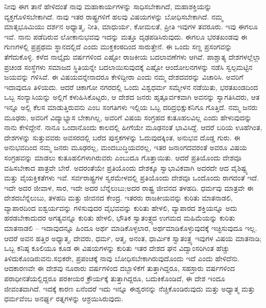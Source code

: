 ನೀವು ಈಗ ತಾನೆ ಹೇಳಿದಂತೆ ನಾವು ಮಹಾಕಾರ್ಯಗಳನ್ನು ಸಾಧಿಸಬೇಕಾಗಿದೆ, ಮಹಾಶಕ್ತಿಯನ್ನು ವ್ಯಕ್ತಗೊಳಿಸಬೇಕಾಗಿದೆ. ನಾವು ಇತರ ರಾಷ್ಟ್ರಗಳಿಗೆ ಹಲವು ವಿಷಯಗಳನ್ನು ಬೋಧಿಸಬೇಕಾಗಿದೆ. ನಮ್ಮ ಮಾತೃಭೂಮಿಯು ದರ್ಶನ ಅಧ್ಯಾತ್ಮ, ನೀತಿ, ಮಾಧುರ್ಯ, ಕೋಮಲತೆ, ಪ್ರೀತಿ ಇವುಗಳ ತವರೂರು. ಇವು ಈಗಲೂ ಇವೆ. ನಾನು ಪಡೆದಿರುವ ಲೋಕಾನುಭವವು ಇದನ್ನು ಮತ್ತೂ ದೃಢಪಡಿಸಿರುವುದು. ಈಗಲೂ ಭರತಖಂಡವು ಈ ಗುಣಗಳಲ್ಲಿ ಪ್ರಪ್ರಥಮ ಸ್ಥಾನದಲ್ಲಿದೆ ಎಂದು ಮುಕ್ತಕಂಠದಿಂದ ಸಾರುತ್ತೇನೆ. ಈ ಒಂದು ಸಣ್ಣ ಪ್ರಸಂಗವನ್ನು ತೆಗೆದುಕೊಳ್ಳಿ. ಕಳೆದ ನಾಲ್ಕೈದು ವರ್ಷಗಳಿಂದ ಎಷ್ಟೋ ರಾಜಕೀಯ ಬದಲಾವಣೆಗಳು ಆಗಿವೆ. ಪಾಶ್ಚಾತ್ಯ ದೇಶಗಳಲ್ಲೆಲ್ಲಾ ಪ್ರಚಂಡ ಸಂಸ್ಥೆಗಳು ಸಮಾಜದ ಸ್ಥಿತಿಯನ್ನೇ ಬದಲಾಯಿಸುವುದಕ್ಕೆ ಎಷ್ಟೋ ಆಂದೋಲನಗಳನ್ನು ನಡೆಸಿ ಸ್ವಲ್ಪಮಟ್ಟಿನ ಜಯವನ್ನು ಗಳಿಸಿವೆ. ಈ ವಿಷಯವನ್ನೇನಾದರೂ ಕೇಳಿದ್ದೀರಾ ಎಂದು ನಮ್ಮ ದೇಶದವರನ್ನು ವಿಚಾರಿಸಿ. ಅವರಿಗೆ ಇದಾವುದೂ ತಿಳಿಯದು. ಆದರೆ ಚಿಕಾಗೋ ನಗರದಲ್ಲಿ ಒಂದು ವಿಶ್ವಧರ್ಮ ಸಮ್ಮೇಳನ ನಡೆಯಿತು, ಭರತಖಂಡದಿಂದ ಒಬ್ಬ ಸಂನ್ಯಾಸಿಯನ್ನು ಅಲ್ಲಿಗೆ ಕಳುಹಿಸಿಕೊಟ್ಟರು, ಆ ದೇಶದ ಜನರು ಹೃತ್ಪೂರ್ವಕವಾಗಿ ಅವನನ್ನು ಸ್ವಾಗತಿಸಿದರು, ಆತ ಇನ್ನೂ ಅಲ್ಲಿ ಕೆಲಸ ಮಾಡುತ್ತಿರುವನು ಎಂಬ ಸಂಗತಿಗಳು ಇಲ್ಲಿಯ ಒಬ್ಬ ದರಿದ್ರ\break ಭಿಕ್ಷುಕನಿಗೂ ಗೊತ್ತಿದೆ. ನಮ್ಮ ಜನರು ಮೂಢರು, ಅವರಿಗೆ ವಿದ್ಯಾಭ್ಯಾಸ ಬೇಕಾಗಿಲ್ಲ, ಅವರಿಗೆ ವಿಷಯ ಸಂಗ್ರಹದ ಕುತೂಹಲವಿಲ್ಲ ಎಂದು ಹೇಳುವುದನ್ನು ನಾನು ಕೇಳಿದ್ದೇನೆ. ನಾನೂ ಒಂದಾನೊಂದು ಕಾಲದಲ್ಲಿ ಹೀಗೆಯೇ ಮೂಢನಂತೆ ಭಾವಿಸಿದ್ದೆ. ಆದರೆ ಬರಿಯ ಊಹೆಗಿಂತ, ದೇಶಗಳನ್ನು ಸುತ್ತುವವರು ಅವಸರದಲ್ಲಿ ಬರೆದ ಪುಸ್ತಕಗಳನ್ನು ಓದುವುದಕ್ಕಿಂತ, ಅನುಭವ ದೊಡ್ಡ ಗುರು. ಈ ಅನುಭವದಿಂದ ನಮ್ಮ ಜನರು ಮೂಢರಲ್ಲ, ಮಂದಬುದ್ಧಿಯವರಲ್ಲ, ಇತರ ಜನಾಂಗದವರಂತೆ ಅವರೂ ವಿಷಯ ಸಂಗ್ರಹವನ್ನು ಮಾಡಲು ಕುತೂಹಲಿಗಳಾಗಿರುವರು ಎಂಬುದೂ ಗೊತ್ತಾಯಿತು. ಆದರೆ ಪ್ರತಿಯೊಂದು ದೇಶವೂ ವಹಿಸಬೇಕಾದ ಪಾತ್ರವೇ ಬೇರೆ. ಅದರಂತೆಯೇ ಪ್ರತಿಯೊಂದು ದೇಶಕ್ಕೂ ಸ್ವಾಭಾವಿಕವಾಗಿ ಅದರದೇ ಆದ ವೈಶಿಷ್ಟ್ಯ ಮತ್ತು ವೈಯಕ್ತಿಕತೆಗಳು ಇವೆ. ಸರ್ವರಾಷ್ಟ್ರಗಳ ಸ್ವರಮೇಳದಲ್ಲಿ ಪ್ರತಿಯೊಂದು ದೇಶವೂ ಒಂದೊಂದು ರಾಗದಂತೆ ಇದೆ. ಇದೇ ಅದರ ಜೀವಾಳ, ಸಾರ, ಇದೇ ಅದರ ಬೆನ್ನೆಲುಬು;\break ಅದರ ರಾಷ್ಟ್ರ ಜೀವನದ ತಳಹದಿ. ಧರ್ಮವು ಮಾತ್ರವೇ ಈ ದೇಶದ\break ಬೆನ್ನೆಲುಬು, ತಳಹದಿ ಮತ್ತು ಜೀವನದ ಕೇಂದ್ರ. ಇತರರು ರಾಜಕೀಯವನ್ನು ಕುರಿತು ಮಾತನಾಡಲಿ, ವ್ಯಾಪಾರದಿಂದ ಐಶ್ವರ್ಯವನ್ನು ಗಳಿಸುವುದರ ವೈಭವವನ್ನು ಕುರಿತು ಹೇಳಲಿ, ವ್ಯಾಪಾರದ ಶಕ್ತಿಯನ್ನೂ ಅದು ಹರಡಬೇಕಾದುದರ ಅಗತ್ಯವನ್ನೂ ಕುರಿತು ಹೇಳಲಿ, ಭೌತಿಕ ಸ್ವಾತಂತ್ರ್ಯದ ಉಗಮದ ಮಹಿಮೆಯನ್ನು ಕುರಿತು ಮಾತನಾಡಲಿ – ಇದಾವುದನ್ನೂ ಹಿಂದೂ ಅರ್ಥ ಮಾಡಿಕೊಳ್ಳಲಾರ, ಅರ್ಥಮಾಡಿಕೊಳ್ಳುವುದಕ್ಕೆ ಇಚ್ಛಿಸುವುದೂ ಇಲ್ಲ. ಆದರೆ ಅವನ ಹತ್ತಿರ ಅಧ್ಯಾತ್ಮ, ದೇವರು, ಧರ್ಮ, ಆತ್ಮ, ಅನಂತ, ಧಾರ್ಮಿಕ ಸ್ವಾತಂತ್ರ್ಯ ಇವುಗಳ ವಿಷಯ ಮಾತನಾಡಿ; ಒಬ್ಬ ಕನಿಷ್ಠ ಕೂಲಿಯೂ ಕೂಡ ಈ ವಿಷಯಗಳನ್ನು ಕುರಿತು ಇತರ ದೇಶದ ಘನ ವಿದ್ವಾಂಸರಿಗಿಂತ ಹೆಚ್ಚು ತಿಳಿದುಕೊಂಡಿರುವನು.\break ಸಭಿಕರೇ, ಪ್ರಪಂಚಕ್ಕೆ ನಾವು ಬೋಧಿಸಬೇಕಾಗಿರುವುದೊಂದು ಇದೆ ಎಂದು ಹೇಳಿದೆನು. ಆದಕಾರಣವೇ ಈ ದೇಶವು ನೂರಾರು ವರ್ಷಗಳಿಂದ ದಬ್ಬಾಳಿಕೆಗೆ ತುತ್ತಾಗಿದ್ದರೂ, ಸಹಸ್ರಾರು ವರ್ಷಗಳಿಂದ ಪರಾಧೀನತೆಯಲ್ಲಿದ್ದರೂ ಪರಕೀಯರ ಕ್ರೌರ್ಯಕ್ಕೆ ತುತ್ತಾಗಿದ್ದರೂ, ಬದುಕಿಕೊಂಡಿದೆ, ಈ ದೇಶ ಇಂದೂ ಜೀವಂತವಾಗಿದೆ. ಇದಕ್ಕೆ ಕಾರಣ ಏನೆಂದರೆ ಇದು ಇನ್ನೂ ಈಶ್ವರನನ್ನು ನೆಚ್ಚಿಕೊಂಡಿರುವುದು ಮತ್ತು ಅಧ್ಯಾತ್ಮ ಮತ್ತು ಧರ್ಮವೆಂಬ ಅನರ್ಘ್ಯ ರತ್ನಗಳನ್ನು ಆಶ್ರಯಿಸಿರುವುದು.

